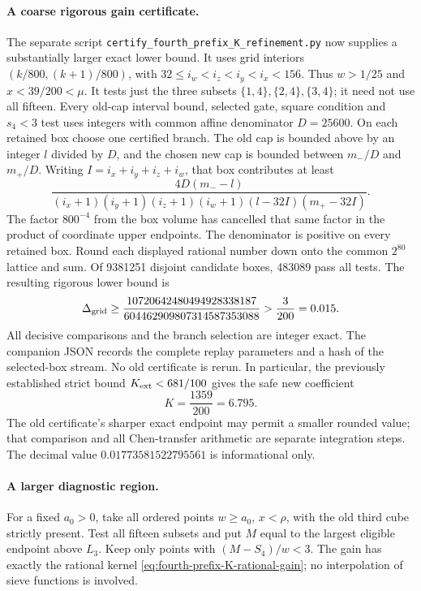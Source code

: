 \documentclass[11pt]{article}
\begin{document}
\paragraph{A coarse rigorous gain certificate.}
The separate script \texttt{certify\_fourth\_prefix\_K\_refinement.py}
now supplies a substantially larger exact lower bound. It uses grid
interiors \((k/800,(k+1)/800)\), with
\(32\le i_w<i_z<i_y<i_x<156\). Thus \(w>1/25\) and
\(x<39/200<\mu\). It tests just the three subsets
\(\{1,4\},\{2,4\},\{3,4\}\); it need not use all fifteen.
Every old-cap interval bound, selected gate, square condition and
\(s_4<3\) test uses integers with common affine denominator
\(D=25600\). On each retained box choose one certified branch.
The old cap is bounded above by an integer \(l\) divided by \(D\),
and the chosen new cap is bounded between \(m_-/D\) and \(m_+/D\).
Writing \(I=i_x+i_y+i_z+i_w\), that box contributes at least
\[
 \frac{4D(m_--l)}
 {(i_x+1)(i_y+1)(i_z+1)(i_w+1)
             (l-32I)(m_+-32I)}.
\]
The factor \(800^{-4}\) from the box volume has cancelled that
same factor in the product of coordinate upper endpoints.
The denominator is positive on every retained box.
Round each displayed rational number down onto the common
\(2^{80}\) lattice and sum. Of 9381251 disjoint candidate boxes,
483089 pass all tests. The resulting rigorous lower bound is
\[
 \Delta_{\rm grid}\ge
 \frac{10720642480494928338187}{604462909807314587353088}
 >\frac{3}{200}=0.015.
\]
All decisive comparisons and the branch selection are integer exact.
The companion JSON records the complete replay parameters and a
hash of the selected-box stream. No old certificate is rerun.
In particular, the previously established strict bound
\(K_{\rm ext}<681/100\) gives the safe new coefficient
\[
 K=\frac{1359}{200}=6.795.
\]
The old certificate's sharper exact endpoint may permit a smaller
rounded value; that comparison and all Chen-transfer arithmetic
are separate integration steps. The decimal value
\(0.01773581522795561\) is informational only.

\paragraph{A larger diagnostic region.}
For a fixed \(a_0>0\), take all ordered points \(w\ge a_0\),
\(x<\rho\), with the old third cube strictly present.
Test all fifteen subsets and put \(M\) equal to the largest
eligible endpoint above \(L_3\).
Keep only points with \((M-S_4)/w<3\).
The gain has exactly the rational kernel
\eqref{eq:fourth-prefix-K-rational-gain}; no interpolation of
sieve functions is involved.
\end{document}
